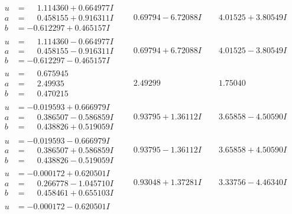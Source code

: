 \documentclass[1p]{elsarticle_modified}
\theoremstyle{definition}
\begin{document}
$$\begin{array}{c|c|c}
\begin{aligned}
u &= \phantom{-}1.114360 + 0.664977 I \\
a &= \phantom{-}0.458155 + 0.916311 I \\
b &= -0.612297 + 0.465157 I\end{aligned}
 & \phantom{-}0.69794 - 6.72088 I & \phantom{-}4.01525 + 3.80549 I \\ \hline\begin{aligned}
u &= \phantom{-}1.114360 - 0.664977 I \\
a &= \phantom{-}0.458155 - 0.916311 I \\
b &= -0.612297 - 0.465157 I\end{aligned}
 & \phantom{-}0.69794 + 6.72088 I & \phantom{-}4.01525 - 3.80549 I \\ \hline\begin{aligned}
u &= \phantom{-}0.675945\phantom{ +0.000000I} \\
a &= \phantom{-}2.49935\phantom{ +0.000000I} \\
b &= \phantom{-}0.470215\phantom{ +0.000000I}\end{aligned}
 & \phantom{-}2.49299\phantom{ +0.000000I} & \phantom{-}1.75040\phantom{ +0.000000I} \\ \hline\begin{aligned}
u &= -0.019593 + 0.666979 I \\
a &= \phantom{-}0.386507 - 0.586859 I \\
b &= \phantom{-}0.438826 + 0.519059 I\end{aligned}
 & \phantom{-}0.93795 + 1.36112 I & \phantom{-}3.65858 - 4.50590 I \\ \hline\begin{aligned}
u &= -0.019593 - 0.666979 I \\
a &= \phantom{-}0.386507 + 0.586859 I \\
b &= \phantom{-}0.438826 - 0.519059 I\end{aligned}
 & \phantom{-}0.93795 - 1.36112 I & \phantom{-}3.65858 + 4.50590 I \\ \hline\begin{aligned}
u &= -0.000172 + 0.620501 I \\
a &= \phantom{-}0.266778 - 1.045710 I \\
b &= \phantom{-}0.458461 + 0.655103 I\end{aligned}
 & \phantom{-}0.93048 + 1.37281 I & \phantom{-}3.33756 - 4.46340 I \\ \hline\begin{aligned}
u &= -0.000172 - 0.620501 I \\

\end{aligned}
\end{array}$$
\end{document}
